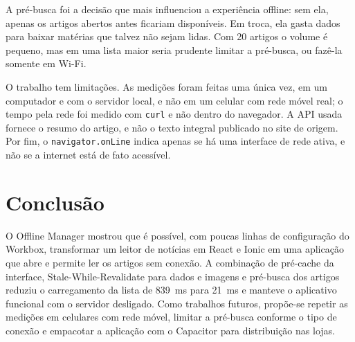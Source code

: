 \documentclass[preprint,10pt,5p]{elsarticle}
\begin{document}
A pré-busca foi a decisão que mais influenciou a experiência offline: sem ela, apenas os artigos abertos antes ficariam disponíveis. Em troca, ela gasta dados para baixar matérias que talvez não sejam lidas. Com 20 artigos o volume é pequeno, mas em uma lista maior seria prudente limitar a pré-busca, ou fazê-la somente em Wi-Fi.

O trabalho tem limitações. As medições foram feitas uma única vez, em um computador e com o servidor local, e não em um celular com rede móvel real; o tempo pela rede foi medido com \texttt{curl} e não dentro do navegador. A API usada fornece o resumo do artigo, e não o texto integral publicado no site de origem. Por fim, o \texttt{navigator.onLine} indica apenas se há uma interface de rede ativa, e não se a internet está de fato acessível.


\section{Conclusão}
\label{conclusion}

O Offline Manager mostrou que é possível, com poucas linhas de configuração do Workbox, transformar um leitor de notícias em React e Ionic em uma aplicação que abre e permite ler os artigos sem conexão. A combinação de pré-cache da interface, Stale-While-Revalidate para dados e imagens e pré-busca dos artigos reduziu o carregamento da lista de 839~ms para 21~ms e manteve o aplicativo funcional com o servidor desligado. Como trabalhos futuros, propõe-se repetir as medições em celulares com rede móvel, limitar a pré-busca conforme o tipo de conexão e empacotar a aplicação com o Capacitor para distribuição nas lojas.



\end{document}
